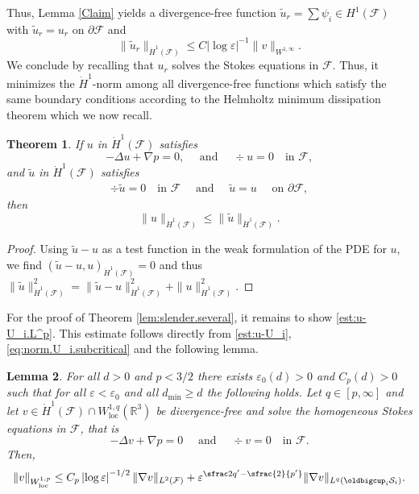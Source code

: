 \documentclass[JEP,XML,SOM,Unicode, NoEqCountersInSection,NoFloatCountersInSection,published]{cedram}
\newcommand{\R}{\mathbb{R}}
\let\eps\varepsilon
\newcommand{\cS}{\mathcal{S}}
\newcommand{\dmin}{d_{\min}}
\newcommand{\loc}{\mathrm{loc}}
\newtheorem{thm}{Theorem}[section]
\newtheorem{Lemma}[thm]{Lemma}
\theoremstyle{definition}
\theoremstyle{remark}
\begin{document}
Thus, Lemma \ref{Claim} yields a divergence-free function $\tilde u_r = \sum \psi_i \in H^1(\mathcal F)$ with $\tilde u_r = u_r$ on $\partial \mathcal F$ and
\begin{equation}
\|\tilde u_r \|_{\dot H^1(\mathcal F)} \leq C \left|\log \eps \right|^{-1} \|v\|_{W^{1,\infty}}.
\end{equation}
We conclude by recalling that $u_r$ solves the Stokes equations in $\mathcal F$. Thus, it minimizes the $\dot H^1$-norm among all divergence-free functions which satisfy the same boundary conditions according to the Helmholtz minimum dissipation theorem which we now recall.

\begin{thm}
\label{Helmholtz}
If $u $ in $\dot H^1({\mathcal F})$ satisfies
\begin{equation*}
- \Delta u + \nabla p = 0, \quad \text{ and }\quad \div u = 0 \quad \text{in } \mathcal F,
\end{equation*}
and $\tilde u $ in $\dot H^1({\mathcal F})$ satisfies
\begin{equation*}
\begin{aligned}
\div \tilde u = 0 \quad \text{in } \mathcal F \quad \text{ and }\quad
\tilde u = u \quad \text{ on } \partial \mathcal F,
\end{aligned}
\end{equation*}
then
\begin{equation*}
\|u\|_{\dot H^1({\mathcal F})}
\leq \|\tilde u\|_{\dot H^1({\mathcal F})}.
\end{equation*}
\end{thm}
\begin{proof}
Using $\tilde u - u$ as a test function in the weak formulation of the PDE for $u$, we find $(\tilde u - u,u)_{\dot H^1({\mathcal F})} =0$
and thus $\|\tilde u\|^2_{\dot H^1({\mathcal F})} = \|\tilde u - u\|^2_{\dot H^1({\mathcal F})} + \| u\|^2_{\dot H^1({\mathcal F})}$.
\end{proof}

For the proof of Theorem \ref{lem:slender.several}, it remains to show \eqref{est:u-U_i.L^p}. This estimate follows directly from \eqref{est:u-U_i}, \eqref{eq:norm.U_i.subcritical} and the following lemma.

\begin{Lemma}\label{lem:improved}
For all $d> 0$ and $p < 3/2$ there exists $\eps_0(d)>0$ and $C_p(d)>0$ such that for all $\eps < \eps_0$ and all $\dmin \geq d$ the following holds. Let $q \in [p,\infty]$ and let $v \in \dot H^1(\mathcal F) \cap W^{1,q}_{\loc}(\R^3)$ be divergence-free and solve the homogeneous Stokes equations in $\mathcal F$, that is
\begin{equation*}
- \Delta v + \nabla p = 0 \quad \text{ and } \quad \div v = 0 \quad \text{in } \mathcal F.
\end{equation*}
Then,
\begin{equation}
\|v\|_{W^{1,p}_\loc} \leq C_p \left|\log \eps\right|^{-1/2} \|\nabla v\|_{L^2(\mathcal F)} + \eps^{\sfrac 2 {q'} - \sfrac{2}{p'}} \|\nabla v\|_{L^q(\oldbigcup_i \cS_i)}.
\end{equation}
\end{Lemma}
\end{document}
